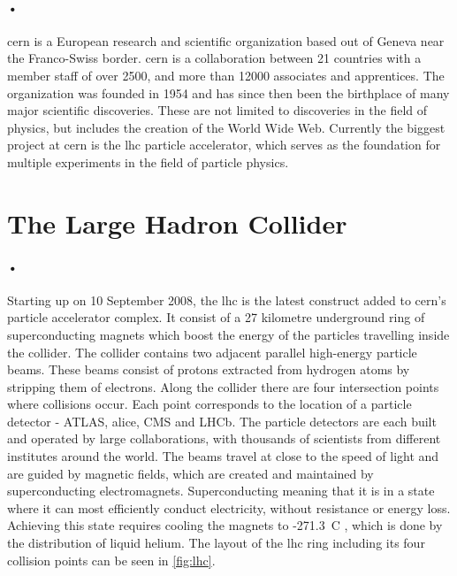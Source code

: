 \documentclass[a4paper, 12pt]{report}
\begin{document}
\paragraph{•}
\gls{cern} is a European research and scientific organization based out of Geneva near the Franco-Swiss border\cite{cern}.
\gls{cern} is a collaboration between 21 countries with a member staff of over 2500, and more than 12000 associates and apprentices.
The organization was founded in 1954 and has since then been the birthplace of many major scientific discoveries.
These are not limited to discoveries in the field of physics, but includes the creation of the World Wide Web\cite{www}.
Currently the biggest project at \gls{cern} is the \gls{lhc} particle accelerator, which serves as the foundation for multiple experiments in the field of particle physics.

\section{The Large Hadron Collider}
\label{sec:lhc}
\paragraph{•}
Starting up on 10 September 2008, the \gls{lhc} is the latest construct added to \gls{cern}'s particle accelerator complex\cite{lhc}.
It consist of a 27 kilometre underground ring of superconducting magnets which boost the energy of the particles travelling inside the collider.
The collider contains two adjacent parallel high-energy particle beams.
These beams consist of protons extracted from hydrogen atoms by stripping them of electrons.
Along the collider there are four intersection points where collisions occur.
Each point corresponds to the location of a particle detector - ATLAS, \gls{alice}, CMS and LHCb.
The particle detectors are each built and operated by large collaborations, with thousands of scientists from different institutes around the world.
The beams travel at close to the speed of light and are guided by magnetic fields, which are created and maintained by superconducting electromagnets.
Superconducting meaning that it is in a state where it can most efficiently conduct electricity, without resistance or energy loss.
Achieving this state requires cooling the magnets to -271.3\degree~C , which is done by the distribution of liquid helium.
The layout of the \gls{lhc} ring including its four collision points can be seen in \ref{fig:lhc}.
\end{document}
